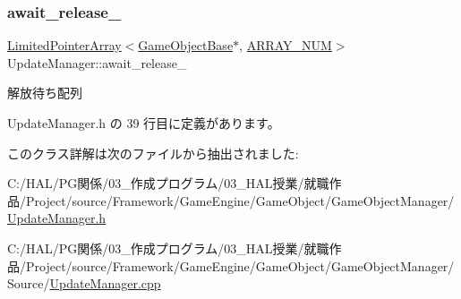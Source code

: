 \subsubsection{\texorpdfstring{await\+\_\+release\+\_\+}{await\_release\_}}
{\footnotesize\ttfamily \mbox{\hyperlink{class_limited_pointer_array}{Limited\+Pointer\+Array}}$<$\mbox{\hyperlink{class_game_object_base}{Game\+Object\+Base}}$\ast$, \mbox{\hyperlink{class_update_manager_a280b884fb6a025cfd92d4f93086c60c6}{A\+R\+R\+A\+Y\+\_\+\+N\+UM}}$>$ Update\+Manager\+::await\+\_\+release\+\_\+\hspace{0.3cm}{\ttfamily [private]}}



解放待ち配列 



 Update\+Manager.\+h の 39 行目に定義があります。



このクラス詳解は次のファイルから抽出されました\+:\begin{DoxyCompactItemize}
\item 
C\+:/\+H\+A\+L/\+P\+G関係/03\+\_\+作成プログラム/03\+\_\+\+H\+A\+L授業/就職作品/\+Project/source/\+Framework/\+Game\+Engine/\+Game\+Object/\+Game\+Object\+Manager/\mbox{\hyperlink{_update_manager_8h}{Update\+Manager.\+h}}\item 
C\+:/\+H\+A\+L/\+P\+G関係/03\+\_\+作成プログラム/03\+\_\+\+H\+A\+L授業/就職作品/\+Project/source/\+Framework/\+Game\+Engine/\+Game\+Object/\+Game\+Object\+Manager/\+Source/\mbox{\hyperlink{_update_manager_8cpp}{Update\+Manager.\+cpp}}\end{DoxyCompactItemize}
